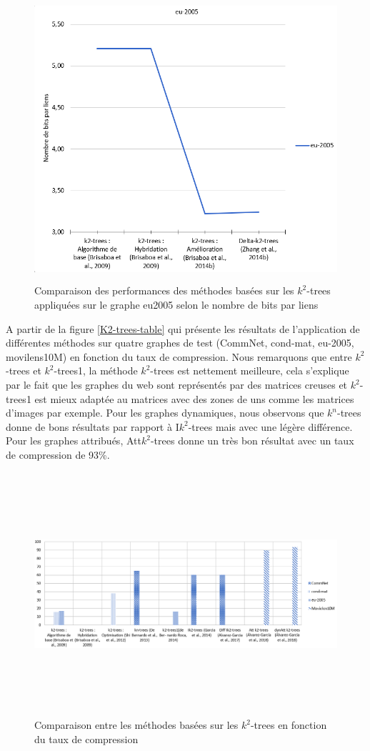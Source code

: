  \begin{figure}[H]
		\includegraphics[height=10.5cm, width=16cm]{./ressources/image/eu2005-k2.png}
		\caption{Comparaison des performances des méthodes basées sur les $k^2$-trees appliquées sur le graphe eu2005 selon le nombre de bits par liens}
		\label{eu2005-k2}
	\end{figure}
	
A partir de la figure \ref{K2-trees-table} qui présente les résultats de l'application de différentes méthodes sur quatre graphes de test (CommNet, cond-mat, eu-2005, movilens10M) en fonction du taux de compression. Nous remarquons que entre $k^2$-trees et $k^2$-trees1, la méthode $k^2$-trees est nettement meilleure, cela s'explique par le fait que les graphes du web sont représentés par des matrices creuses et $k^2$-trees1 est mieux adaptée au matrices avec des zones de uns comme les matrices d'images par exemple.	Pour les graphes dynamiques, nous observons que $k^n$-trees donne de bons résultats par rapport à I$k^2$-trees mais avec une légère différence. Pour les graphes attribués, Att$k^2$-trees donne un très bon résultat avec un taux de compression de 93\%. 
	\begin{figure}[H]
		\includegraphics[height=9cm, width=18cm]{./ressources/image/k2-taux.png}
		\caption{Comparaison entre les méthodes basées sur les $k^2$-trees en fonction du taux de compression}
		\label{k2-taux}
	\end{figure}
	


